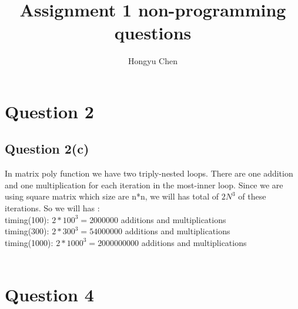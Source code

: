 \documentclass{article}
\author{Hongyu Chen}
\title{Assignment 1 non-programming questions}
\begin{document}
 
    \maketitle
   \section{Question 2}
        \subsection{Question 2(c)} 
        In matrix poly function we have two triply-nested loops. There are one addition and one multiplication for each iteration in the most-inner loop. Since we are using square matrix which size are n*n, we will has total of $2N^3$ of these iterations. So we will has :\\
        timing(100): $2*100^3 = 2000000$ additions and multiplications\\
        timing(300): $2*300^3 = 54000000$ additions and multiplications\\
        timing(1000): $2*1000^3 = 2000000000 $ additions and multiplications
        \\\\
   \section{Question 4}
\end{document}
